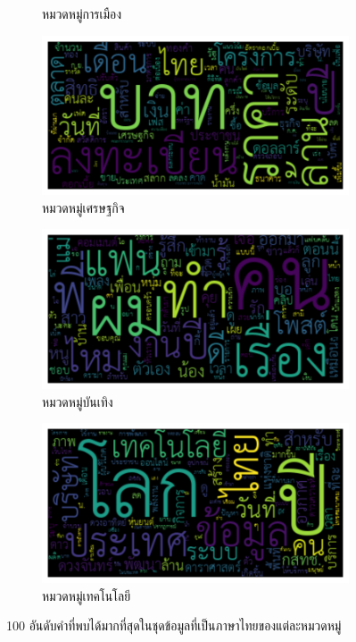 \documentclass[12pt,oneside,openright,a4paper]{cpe-thai-project}
\begin{document}
\begin{figure}[!ht]
\begin{subfigure}{0.49\textwidth}
            \caption{หมวดหมู่การเมือง}
            \label{fig:subim_th4}
          \end{subfigure}
          \begin{subfigure}{0.49\textwidth}
            \includegraphics[width=\linewidth]{./img/thai_stat/money_wc.png} 
            \caption{หมวดหมู่เศรษฐกิจ}
            \label{fig:subim_th3}
          \end{subfigure}
          \begin{subfigure}{0.49\textwidth}
            \includegraphics[width=\linewidth]{./img/thai_stat/ent_wc.png} 
            \caption{หมวดหมู่บันเทิง}
            \label{fig:subim_th5}
          \end{subfigure}
          \begin{subfigure}{0.49\textwidth}
            \includegraphics[width=\linewidth]{./img/thai_stat/tech_wc.png}
            \caption{หมวดหมู่เทคโนโลยี}
            \label{fig:subim_th6}
          \end{subfigure}
          \caption{100 อันดับคำที่พบได้มากที่สุดในชุดข้อมูลที่เป็นภาษาไทยของแต่ละหมวดหมู่}
          \label{fig:tag_wc_thai}
        \end{figure}
        
\end{document}
